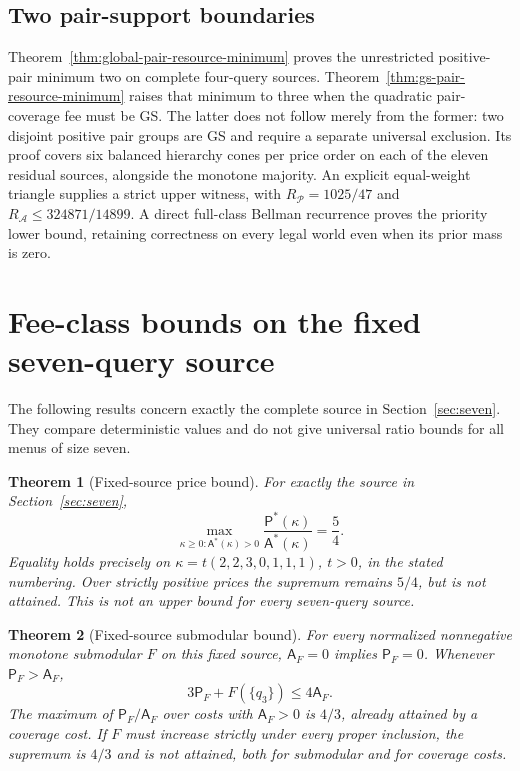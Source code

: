\documentclass[pdflatex,sn-mathphys-num]{sn-jnl}
\newcommand{\A}{\mathsf{A}}
\newcommand{\Pcost}{\mathsf{P}}
\theoremstyle{thmstyleone}
\newtheorem{theorem}{Theorem}
\theoremstyle{thmstylethree}
\theoremstyle{thmstyletwo}
\begin{document}
\subsection{Two pair-support boundaries}
\label{sec:pair-boundaries-core}
Theorem~\ref{thm:global-pair-resource-minimum} proves the unrestricted
positive-pair minimum two on complete four-query sources.
Theorem~\ref{thm:gs-pair-resource-minimum} raises that minimum to
three when the quadratic pair-coverage fee must be GS. The latter
does not follow merely from the former: two disjoint positive pair
groups are GS and require a separate universal exclusion. Its
proof covers six balanced hierarchy cones per price order on each
of the eleven residual sources, alongside the monotone majority.
An explicit equal-weight triangle supplies a strict upper witness,
with $R_{\mathcal P}=1025/47$ and
$R_{\mathcal A}\leq324871/14899$. A direct full-class Bellman
recurrence proves the priority lower bound, retaining correctness
on every legal world even when its prior mass is zero.



\section{Fee-class bounds on the fixed seven-query source}
\label{sec:fixed-cost-core}
The following results concern exactly the complete source in
Section~\ref{sec:seven}. They compare deterministic values and do not
give universal ratio bounds for all menus of size seven.

\begin{theorem}[Fixed-source price bound]\label{thm:price}
For exactly the source in Section~\ref{sec:seven},
\[
 \max_{\kappa\geq0:\A^*(\kappa)>0}
 \frac{\Pcost^*(\kappa)}{\A^*(\kappa)}=\frac54.
\]
Equality holds precisely on $\kappa=t(2,2,3,0,1,1,1)$, $t>0$, in the stated numbering. Over strictly positive prices the supremum remains $5/4$, but is not attained. This is not an upper bound for every seven-query source.
\end{theorem}

\begin{theorem}[Fixed-source submodular bound]\label{thm:submodular}
For every normalized nonnegative monotone submodular $F$ on this fixed source, $\A_F=0$ implies $\Pcost_F=0$. Whenever $\Pcost_F>\A_F$,
\begin{equation}\label{eq:strengthened}
 3\Pcost_F+F(\{q_3\})\leq4\A_F.
\end{equation}
The maximum of $\Pcost_F/\A_F$ over costs with $\A_F>0$ is $4/3$, already attained by a coverage cost. If $F$ must increase strictly under every proper inclusion, the supremum is $4/3$ and is not attained, both for submodular and for coverage costs.
\end{theorem}
\end{document}
